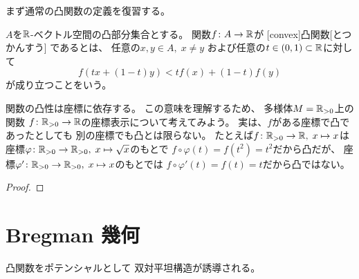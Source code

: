 \documentclass[report]{jlreq}
\begin{document}

まず通常の凸関数の定義を復習する。

\begin{proposition}[凸関数]
    $A$を$\mathbb{R}$-ベクトル空間の凸部分集合とする。
    関数$f \colon A \to \mathbb{R}$が
    [convex]{凸関数}[とつかんすう]
    であるとは、
    任意の$x, y \in A, \; x \neq y$
    および任意の$t \in (0, 1) \subset \mathbb{R}$に対して
    \begin{equation}
        f(tx + (1 - t)y) < tf(x) + (1 - t)f(y)
    \end{equation}
    が成り立つことをいう。
\end{proposition}

\begin{remark}
    関数の凸性は座標に依存する。
    この意味を理解するため、
    多様体$M = \mathbb{R}_{> 0}$上の関数
    $f \colon \mathbb{R}_{> 0} \to \mathbb{R}$の座標表示について考えてみよう。
    実は、$f$がある座標で凸であったとしても
    別の座標でも凸とは限らない。
    たとえば$f \colon \mathbb{R}_{> 0} \to \mathbb{R}, \; x \mapsto x$は
    座標$\varphi \colon \mathbb{R}_{> 0} \to \mathbb{R}_{> 0}, \; x \mapsto \sqrt{x}$のもとで
    $f \circ \varphi(t) = f(t^2) = t^2$だから凸だが、
    座標$\varphi' \colon \mathbb{R}_{> 0} \to \mathbb{R}_{> 0}, \; x \mapsto x$のもとでは
    $f \circ \varphi'(t) = f(t) = t$だから凸ではない。
\end{remark}

\begin{proposition}[凸性はアファイン変換で不変]
    \TODO{}
\end{proposition}

\begin{proof}
    \TODO{}
\end{proof}

\begin{definition}[Legendre 変換]
    \TODO{}
\end{definition}

%
\section{Bregman 幾何}

凸関数をポテンシャルとして
双対平坦構造が誘導される。

\begin{definition}
    \TODO{}
\end{definition}
\end{document}
